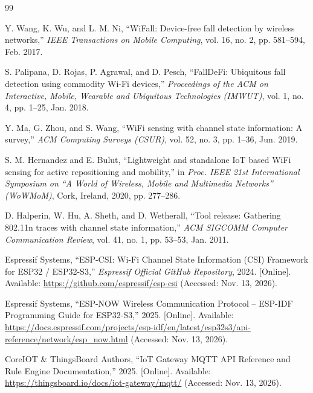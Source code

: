\documentclass{hcmut-report}
\begin{document}
\begin{thebibliography}{99}

Y. Wang, K. Wu, and L. M. Ni, ``WiFall: Device-free fall detection by wireless networks,'' \textit{IEEE Transactions on Mobile Computing}, vol. 16, no. 2, pp. 581--594, Feb. 2017.

S. Palipana, D. Rojas, P. Agrawal, and D. Pesch, ``FallDeFi: Ubiquitous fall detection using commodity Wi-Fi devices,'' \textit{Proceedings of the ACM on Interactive, Mobile, Wearable and Ubiquitous Technologies (IMWUT)}, vol. 1, no. 4, pp. 1--25, Jan. 2018.

Y. Ma, G. Zhou, and S. Wang, ``WiFi sensing with channel state information: A survey,'' \textit{ACM Computing Surveys (CSUR)}, vol. 52, no. 3, pp. 1--36, Jun. 2019.

S. M. Hernandez and E. Bulut, ``Lightweight and standalone IoT based WiFi sensing for active repositioning and mobility,'' in \textit{Proc. IEEE 21st International Symposium on ``A World of Wireless, Mobile and Multimedia Networks'' (WoWMoM)}, Cork, Ireland, 2020, pp. 277--286.

D. Halperin, W. Hu, A. Sheth, and D. Wetherall, ``Tool release: Gathering 802.11n traces with channel state information,'' \textit{ACM SIGCOMM Computer Communication Review}, vol. 41, no. 1, pp. 53--53, Jan. 2011.

Espressif Systems, ``ESP-CSI: Wi-Fi Channel State Information (CSI) Framework for ESP32 / ESP32-S3,'' \textit{Espressif Official GitHub Repository}, 2024. [Online]. Available: \url{https://github.com/espressif/esp-csi} (Accessed: Nov. 13, 2026).

Espressif Systems, ``ESP-NOW Wireless Communication Protocol -- ESP-IDF Programming Guide for ESP32-S3,'' 2025. [Online]. Available: \url{https://docs.espressif.com/projects/esp-idf/en/latest/esp32s3/api-reference/network/esp_now.html} (Accessed: Nov. 13, 2026).

CoreIOT \& ThingsBoard Authors, ``IoT Gateway MQTT API Reference and Rule Engine Documentation,'' 2025. [Online]. Available: \url{https://thingsboard.io/docs/iot-gateway/mqtt/} (Accessed: Nov. 13, 2026).

\end{thebibliography}
\end{document}
